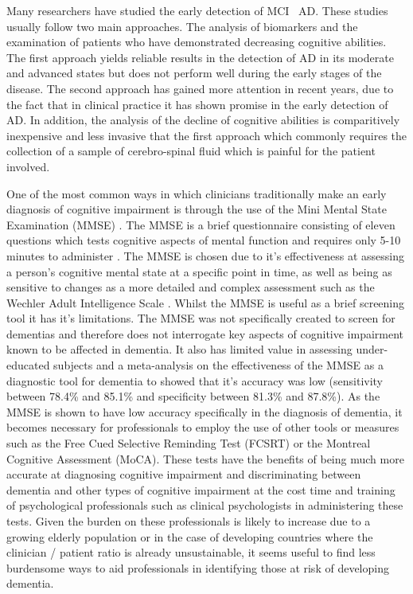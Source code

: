 \documentclass[12pt, twoside, a4paper]{article}
\begin{document}
\par 
Many researchers have studied the early detection of MCI \ AD. These studies usually follow two main approaches. The analysis of biomarkers and the examination of patients who have demonstrated decreasing cognitive abilities. The first approach yields reliable results in the detection of AD in its moderate and advanced states but does not perform well during the early stages of the disease. The second approach has gained more attention in recent years, due to the fact that in clinical practice it has shown promise in the early detection of AD. In addition, the analysis of the decline of cognitive abilities is comparitively inexpensive and less invasive that the first approach which commonly requires the collection of a sample of cerebro-spinal fluid which is painful for the patient involved. 
\par
One of the most common ways in which clinicians traditionally make an early diagnosis of cognitive impairment is through the use of the Mini Mental State Examination (MMSE) \cite{Folstein1975}. The MMSE is a brief questionnaire consisting of eleven questions which tests cognitive aspects of mental function and requires only 5-10 minutes to administer \cite{Folstein1975}. The MMSE is chosen due to it's effectiveness at assessing a person's cognitive mental state at a specific point in time, as well as being as sensitive to changes as a more detailed and complex assessment such as the Wechler Adult Intelligence Scale \cite{Folstein1975}. Whilst the MMSE is useful as a brief screening tool it has it's limitations. The MMSE was not specifically created to screen for dementias and therefore does not interrogate key aspects of cognitive impairment known to be affected in dementia. It also has limited value in assessing under-educated subjects and a meta-analysis on the effectiveness of the MMSE as a diagnostic tool for dementia to showed that it's accuracy was low (sensitivity between 78.4\% and 85.1\% and specificity between 81.3\% and 87.8\%). As the MMSE is shown to have low accuracy specifically in the diagnosis of dementia, it becomes necessary for professionals to employ the use of other tools or measures such as the Free Cued Selective Reminding Test (FCSRT) or the Montreal Cognitive Assessment (MoCA). These tests have the benefits of being much more accurate at diagnosing cognitive impairment and discriminating between dementia and other types of cognitive impairment at the cost time and training of psychological professionals such as clinical psychologists in administering these tests. Given the burden on these professionals is likely to increase due to a growing elderly population or in the case of developing countries where the clinician / patient ratio is already unsustainable, it seems useful to find less burdensome ways to aid professionals in identifying those at risk of developing dementia.
\end{document}
